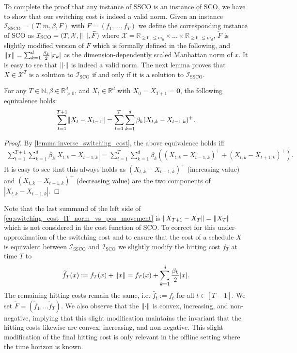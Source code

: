 To complete the proof that any instance of SSCO is an instance of SCO, we have to show that our switching cost is indeed a valid norm. Given an instance $\mathcal{I}_{\text{SSCO}} = (T, m, \beta, F)$ with $F = (f_1, \dots, f_T)$ we define the corresponding instance of SCO as $\mathcal{I}_{\text{SCO}} = (T, \mathcal{X}, \lVert\cdot\rVert, \widetilde{F})$ where $\mathcal{X} = \mathbb{R}_{\geq 0, \leq m_0} \times \dots \times \mathbb{R}_{\geq 0, \leq m_d}$, $\widetilde{F}$ is slightly modified version of $F$ which is formally defined in the following, and $\lVert x\rVert = \sum_{k=1}^d \frac{\beta_k}{2} |x_k|$ as the dimension-dependently scaled Manhattan norm of $x$. It is easy to see that $\lVert\cdot\rVert$ is indeed a valid norm. The next lemma proves that $X \in \mathcal{X}^T$ is a solution to $\mathcal{I}_{\text{SCO}}$ if and only if it is a solution to $\mathcal{I}_{\text{SSCO}}$.

\begin{lemma}\label{lemma:switching_cost_l1_norm_vs_pos_movement}
For any $T \in \mathbb{N}, \beta \in \mathbb{R}_{>0}^d$, and $X_t \in \mathbb{R}^d$ with $X_0 = X_{T+1} = \mathbf{0}$, the following equivalence holds:
\begin{align}\label{eq:switching_cost_l1_norm_vs_pos_movement}
    \sum_{t=1}^{T+1} \lVert X_t - X_{t-1}\rVert = \sum_{t=1}^T \sum_{k=1}^d \beta_k (X_{t,k} - X_{t-1,k})^+.
\end{align}
\end{lemma}
\begin{proof}
By \cref{lemma:inverse_switching_cost}, the above equivalence holds iff \begin{align*}
    \sum_{t=1}^{T+1} \sum_{k=1}^d \beta_k |X_{t,k} - X_{t-1,k}| = \sum_{t=1}^T \sum_{k=1}^d \beta_k ((X_{t,k} - X_{t-1,k})^+ + (X_{t,k} - X_{t+1,k})^+).
\end{align*}
It is easy to see that this always holds as $(X_{t,k} - X_{t-1,k})^+$ (increasing value) and $(X_{t,k} - X_{t+1,k})^+$ (decreasing value) are the two components of $|X_{t,k} - X_{t-1,k}|$.
\end{proof}

Note that the last summand of the left side of \cref{eq:switching_cost_l1_norm_vs_pos_movement} is $\lVert X_{T+1} - X_T\rVert = \lVert X_T\rVert$ which is not considered in the cost function of SCO. To correct for this under-approximation of the switching cost and to ensure that the cost of a schedule $X$ is equivalent between $\mathcal{I}_{\text{SSCO}}$ and $\mathcal{I}_{\text{SCO}}$ we slightly modify the hitting cost $f_T$ at time $T$ to \begin{align*}
    \widetilde{f}_T(x) := f_T(x) + \lVert x\rVert = f_T(x) + \sum_{k=1}^d \frac{\beta_k}{2} |x|.
\end{align*} The remaining hitting costs remain the same, i.e. $\widetilde{f_t} := f_t$ for all $t \in [T-1]$. We set $\widetilde{F} = (\widetilde{f}_1, \dots \widetilde{f}_T)$. We also observe that the $\lVert\cdot\rVert$ is convex, increasing, and non-negative, implying that this slight modification maintains the invariant that the hitting costs likewise are convex, increasing, and non-negative. This slight modification of the final hitting cost is only relevant in the offline setting where the time horizon is known.

